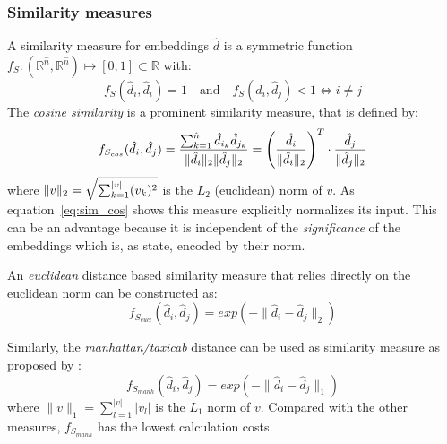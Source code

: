 \subsubsection{Similarity measures}
\label{subsec:similarity_measure}
A similarity measure for embeddings $\hat{d}$ is a symmetric function $f_S: (\mathbb{R}^{\hat{n}}, \mathbb{R}^{\hat{n}}) \mapsto [0, 1] \subset \mathbb{R}$ with:
\begin{equation}
f_S(\hat{d}_i, \hat{d}_i) = 1 \quad \text{and} \quad f_S(\hat{d}_i, \hat{d}_j) < 1 \Leftrightarrow i \neq j
\end{equation}
The \textit{cosine similarity} is a prominent similarity measure, that is defined by:
\begin{equation} \label{eq:sim_cos}
f_{S_{cos}}(\hat{d}_i, \hat{d}_j) = \frac{\sum_{k=1}^{\hat{n}}\hat{d}_{i_k} \hat{d}_{j_k}}{\lVert\hat{d}_i\rVert_2 \lVert\hat{d}_j\rVert_2} = \left(\frac{\hat{d}_i}{\lVert\hat{d}_i\rVert_2}\right)^T \cdot \frac{\hat{d}_j}{\lVert\hat{d}_j\rVert_2}
\end{equation}
where $\lVert v\rVert_2 = \sqrt{\sum_{k=1}^{|v|}(v_k)^2}$ is the $L_2$ (euclidean) norm of $v$. As equation~\eqref{eq:sim_cos} shows this measure explicitly normalizes its input. This can be an advantage because it is independent of the \textit{significance} of the embeddings which is, as \textcite{schakel_measuring_2015} state, encoded by their norm.

An \textit{euclidean} distance based similarity measure that relies directly on the euclidean norm can be constructed as:
\begin{equation}
f_{S_{eucl}}(\hat{d}_i, \hat{d}_j) = exp(-\lVert\hat{d}_i - \hat{d}_j\rVert_2)
\end{equation}


Similarly, the \textit{manhattan/taxicab} distance can be used as similarity measure as proposed by \textcite{mueller_siamese_2016}:
\begin{equation}
f_{S_{manh}}(\hat{d}_i, \hat{d}_j) = exp(-\lVert\hat{d}_i - \hat{d}_j\rVert_1)
\end{equation}
where $\lVert v\rVert_1 = \sum\limits_{l=1}^{|v|}|v_l|$ is the $L_1$ norm of $v$. Compared with the other measures, $f_{S_{manh}}$ has the lowest calculation costs. %


